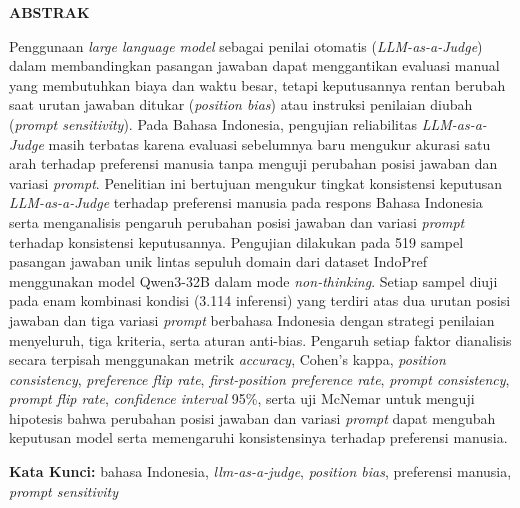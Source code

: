 \begin{center}
\textbf{\large ABSTRAK}\\
\end{center}
\vspace{1cm}

\begingroup
\fontsize{11pt}{13pt}\selectfont
\singlespacing

Penggunaan \textit{large language model} sebagai penilai otomatis (\textit{LLM-as-a-Judge}) dalam membandingkan pasangan jawaban dapat menggantikan evaluasi manual yang membutuhkan biaya dan waktu besar, tetapi keputusannya rentan berubah saat urutan jawaban ditukar (\textit{position bias}) atau instruksi penilaian diubah (\textit{prompt sensitivity}). Pada Bahasa Indonesia, pengujian reliabilitas \textit{LLM-as-a-Judge} masih terbatas karena evaluasi sebelumnya baru mengukur akurasi satu arah terhadap preferensi manusia tanpa menguji perubahan posisi jawaban dan variasi \textit{prompt}. Penelitian ini bertujuan mengukur tingkat konsistensi keputusan \textit{LLM-as-a-Judge} terhadap preferensi manusia pada respons Bahasa Indonesia serta menganalisis pengaruh perubahan posisi jawaban dan variasi \textit{prompt} terhadap konsistensi keputusannya. Pengujian dilakukan pada 519 sampel pasangan jawaban unik lintas sepuluh domain dari dataset IndoPref menggunakan model Qwen3-32B dalam mode \textit{non-thinking}. Setiap sampel diuji pada enam kombinasi kondisi (3.114 inferensi) yang terdiri atas dua urutan posisi jawaban dan tiga variasi \textit{prompt} berbahasa Indonesia dengan strategi penilaian menyeluruh, tiga kriteria, serta aturan anti-bias. Pengaruh setiap faktor dianalisis secara terpisah menggunakan metrik \textit{accuracy}, Cohen's kappa, \textit{position consistency}, \textit{preference flip rate}, \textit{first-position preference rate}, \textit{prompt consistency}, \textit{prompt flip rate}, \textit{confidence interval} 95\%, serta uji McNemar untuk menguji hipotesis bahwa perubahan posisi jawaban dan variasi \textit{prompt} dapat mengubah keputusan model serta memengaruhi konsistensinya terhadap preferensi manusia.

\vspace{0.5cm}
\noindent \textbf{Kata Kunci:} bahasa Indonesia, \textit{llm-as-a-judge}, \textit{position bias}, preferensi manusia, \textit{prompt sensitivity}
\endgroup